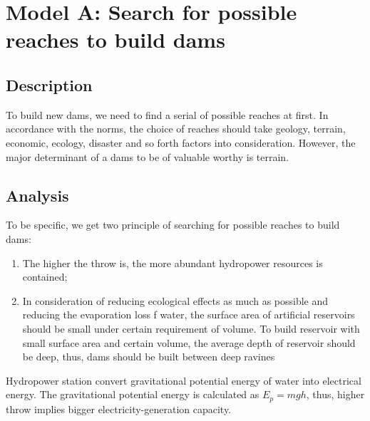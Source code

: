 \documentclass{mcmthesis}
\begin{document}



\section{Model A: Search for possible reaches to build dams}

\subsection{Description}
\indent To build new dams, we need to find a serial of possible reaches at first. In accordance with the norms, the choice of reaches should take geology, terrain, economic, ecology, disaster and so forth factors into consideration. However, the major determinant of a dams to be of valuable worthy is terrain. \\

\subsection{Analysis}
\indent To be specific, we get two principle of searching for possible reaches to build dams:
\begin{enumerate}
  \setlength{\itemsep}{0pt}
  \setlength{\parsep}{0pt}
  \setlength{\parskip}{0pt}
  \item The higher the throw is, the more abundant hydropower resources is contained;
  \item In consideration of reducing ecological effects as much as possible and reducing the evaporation loss f water, the surface area of artificial reservoirs should be small under certain requirement of volume. To build reservoir with small surface area and certain volume, the average depth of reservoir should be deep, thus, dams should be built between deep ravines
\end{enumerate}

\indent Hydropower station convert gravitational potential energy of water into electrical energy. The gravitational potential energy is calculated as $E_{p} = mgh$, thus, higher throw implies bigger electricity-generation capacity.\\
\end{document}
